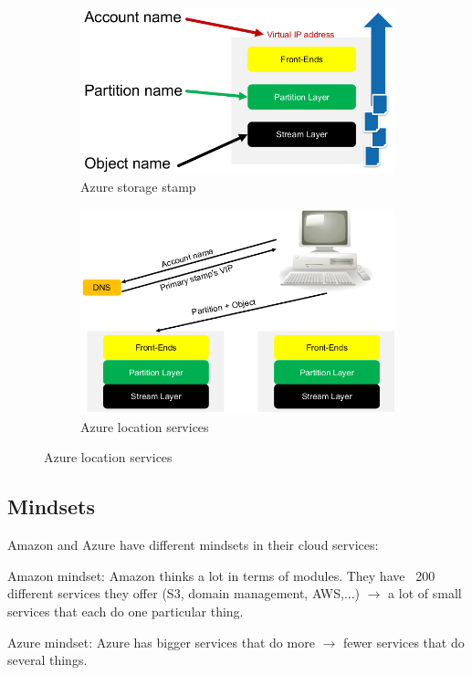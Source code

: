 \documentclass[11pt,oneside,a4paper]{article}
\begin{document}
\vspace{-\topsep}
\begin{figure}[hb!]
	\centering
	\begin{subfigure}[t]{.5\textwidth}
		\centering
		\includegraphics[width=0.5\linewidth]{figures/azure_storage_stamp}
		\caption{Azure storage stamp}
		\label{fig:azure_storage_stamp}
	\end{subfigure}%
	\begin{subfigure}[t]{.5\textwidth}
		\centering
		\includegraphics[width=0.6\linewidth]{figures/azure_location_services}
		\caption{Azure location services}
		\label{fig:azure_location_services}
	\end{subfigure}
\end{figure}

\subsection{Mindsets}

Amazon and Azure have different mindsets in their cloud services:

\begin{compactitem}
	\item Amazon mindset: Amazon thinks a lot in terms of modules. They have ~200 different services they offer (S3, domain management, AWS,...) $\rightarrow$ a lot of small services that each do one particular thing.
	\item Azure mindset: Azure has bigger services that do more $\rightarrow$ fewer services that do several things.
\end{compactitem}
\end{document}
